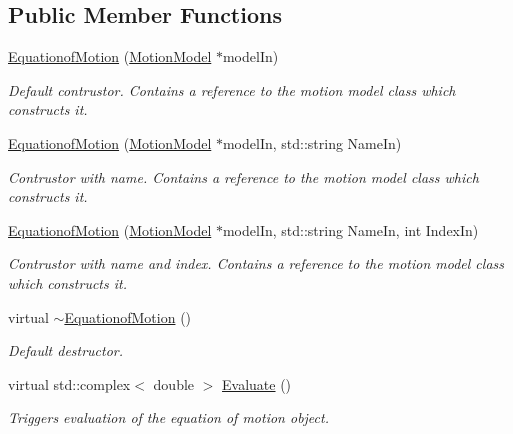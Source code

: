 \subsection*{Public Member Functions}
\begin{DoxyCompactItemize}
\item 
\hyperlink{classosea_1_1ofreq_1_1_equationof_motion_a61c6e25419cf9c5402a4e30496ef6b19}{Equationof\-Motion} (\hyperlink{classosea_1_1ofreq_1_1_motion_model}{Motion\-Model} $\ast$model\-In)
\begin{DoxyCompactList}\small\item\em Default contrustor. Contains a reference to the motion model class which constructs it. \end{DoxyCompactList}\item 
\hyperlink{classosea_1_1ofreq_1_1_equationof_motion_adb22faa7fbb72f4ee01931fe6b9571ee}{Equationof\-Motion} (\hyperlink{classosea_1_1ofreq_1_1_motion_model}{Motion\-Model} $\ast$model\-In, std\-::string Name\-In)
\begin{DoxyCompactList}\small\item\em Contrustor with name. Contains a reference to the motion model class which constructs it. \end{DoxyCompactList}\item 
\hyperlink{classosea_1_1ofreq_1_1_equationof_motion_a334a999be59f6cba06cbbb2cf3134ad9}{Equationof\-Motion} (\hyperlink{classosea_1_1ofreq_1_1_motion_model}{Motion\-Model} $\ast$model\-In, std\-::string Name\-In, int Index\-In)
\begin{DoxyCompactList}\small\item\em Contrustor with name and index. Contains a reference to the motion model class which constructs it. \end{DoxyCompactList}\item 
virtual \hyperlink{classosea_1_1ofreq_1_1_equationof_motion_ab06097df1a54719d7a5682babbd9f233}{$\sim$\-Equationof\-Motion} ()
\begin{DoxyCompactList}\small\item\em Default destructor. \end{DoxyCompactList}\item 
virtual std\-::complex$<$ double $>$ \hyperlink{classosea_1_1ofreq_1_1_equationof_motion_a7198b4661f6c0a4c1f280863228bd63c}{Evaluate} ()
\begin{DoxyCompactList}\small\item\em Triggers evaluation of the equation of motion object. \end{DoxyCompactList}\item 

\end{DoxyCompactItemize}
